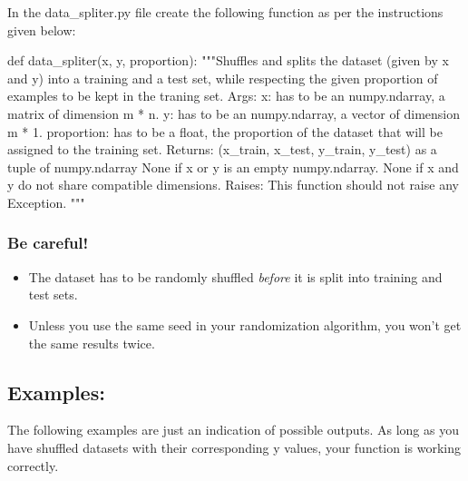 \documentclass[]{article}
\newenvironment{Shaded}{\begin{snugshade}}{\end{snugshade}}
\newcommand{\CommentTok}[1]{\textcolor[rgb]{0.48,0.49,0.49}{#1}}
\newcommand{\KeywordTok}[1]{\textcolor[rgb]{0.81,0.81,0.76}{#1}}
\newcommand{\NormalTok}[1]{\textcolor[rgb]{0.81,0.81,0.76}{#1}}
\begin{document}
In the data\_spliter.py file create the following function as per the
instructions given below:

\begin{Shaded}
\begin{Highlighting}[]
\KeywordTok{def}\NormalTok{ data_spliter(x, y, proportion):}
    \CommentTok{"""Shuffles and splits the dataset (given by x and y) into a training and a test set, while respecting the given proportion of examples to be kept in the traning set.}
\CommentTok{    Args:}
\CommentTok{      x: has to be an numpy.ndarray, a matrix of dimension m * n.}
\CommentTok{      y: has to be an numpy.ndarray, a vector of dimension m * 1.}
\CommentTok{      proportion: has to be a float, the proportion of the dataset that will be assigned to the training set.}
\CommentTok{    Returns:}
\CommentTok{      (x_train, x_test, y_train, y_test) as a tuple of numpy.ndarray}
\CommentTok{      None if x or y is an empty numpy.ndarray.}
\CommentTok{      None if x and y do not share compatible dimensions.}
\CommentTok{    Raises:}
\CommentTok{      This function should not raise any Exception.}
\CommentTok{    """}
\end{Highlighting}
\end{Shaded}

\hypertarget{be-careful}{%
\subsubsection{Be careful!}\label{be-careful}}

\begin{itemize}
\item
  The dataset has to be randomly shuffled \emph{before} it is split into
  training and test sets.
\item
  Unless you use the same seed in your randomization algorithm, you
  won't get the same results twice.
\end{itemize}

\hypertarget{examples-10}{%
\subsection{Examples:}\label{examples-10}}

The following examples are just an indication of possible outputs. As
long as you have shuffled datasets with their corresponding y values,
your function is working correctly.
\end{document}
